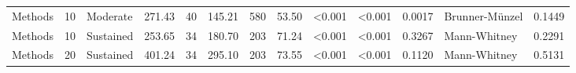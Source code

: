\begin{table}[H]
{\begin{tabular}{l r p{4cm} c c c c r r r r l r}
Methods & 10 & Moderate &  271.43 & 40 & 145.21 & 580 & 53.50 & \textless 0.001 & \textless 0.001 & 0.0017 &  Brunner-Münzel & 0.1449 \\ 
Methods & 10 & Sustained &  253.65 & 34 & 180.70 & 203 & 71.24 & \textless 0.001 & \textless 0.001 & 0.3267 &  Mann-Whitney & 0.2291 \\ 
Methods & 20 & Sustained &  401.24 & 34 & 295.10 & 203 & 73.55 & \textless 0.001 & \textless 0.001 & 0.1120 &  Mann-Whitney & 0.5131 \\ 
\bottomrule
\end{tabular}%
} 
\end{table}
\newpage 
